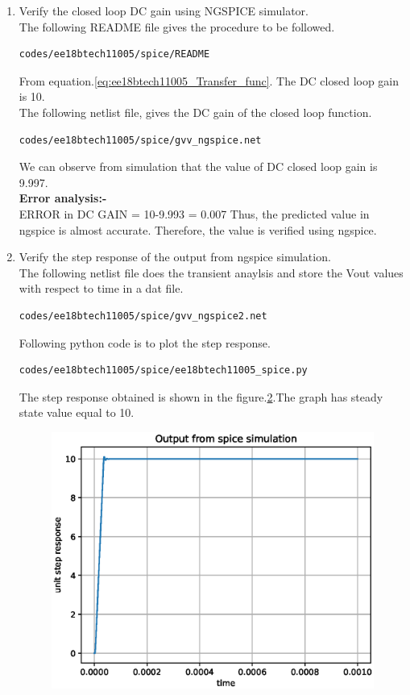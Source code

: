 \begin{enumerate}[label=\arabic*.,ref=\theenumi]
\begin{figure}[!hbt]
\label{fig:Final_circuit}
\end{figure}
\item Verify the closed loop DC gain using NGSPICE simulator.
\\
\solution 
The following README file gives the procedure to be followed.
\begin{lstlisting}
codes/ee18btech11005/spice/README
\end{lstlisting}
From equation.\ref{eq:ee18btech11005_Transfer_func}.
The DC closed loop gain is 10.\\
The following netlist file, gives the DC gain of the closed loop function.
\begin{lstlisting}
codes/ee18btech11005/spice/gvv_ngspice.net
\end{lstlisting}
We can observe from simulation that the value of DC closed loop gain is 9.997.\\
\textbf{Error analysis:-}\\
ERROR in DC GAIN = 10-9.993 = 0.007
Thus, the predicted value in ngspice is almost accurate.
Therefore, the value is verified using ngspice.
\item Verify the step response of the output from ngspice simulation.\\
\solution The following netlist file does the transient anaylsis and store the Vout values with respect to time in a dat file. 
\begin{lstlisting}
codes/ee18btech11005/spice/gvv_ngspice2.net
\end{lstlisting}
Following python code is to plot the step response.
\begin{lstlisting}
codes/ee18btech11005/spice/ee18btech11005_spice.py
\end{lstlisting}
The step response obtained is shown in the figure.\ref{fig:ee18btech11005_3}.The graph has steady state value equal to 10.
\begin{figure}[!ht]
\centering
\includegraphics[width=\columnwidth]{./figs/ee18btech11005/ee18btech11005_spice.eps}
\caption{}
\label{fig:ee18btech11005_3}
\end{figure}

\end{enumerate}
